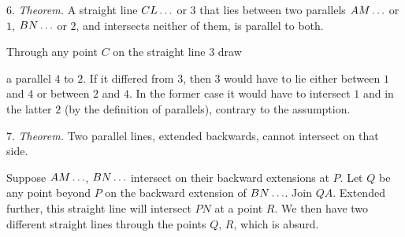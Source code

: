 6. \emph{Theorem.} A straight line $CL\mathinner{.\,.\,.}$ or $3$ that lies between two parallels $AM\mathinner{.\,.\,.}$ or $1$, $BN\mathinner{.\,.\,.}$ or $2$, and intersects neither of them, is parallel to both.

 Through any point $C$ on the straight line $3$ draw

\begin{center}

\end{center}
\noindent a parallel $4$ to $2$. If it differed from $3$, then $3$ would have to lie either between $1$ and $4$ or between $2$ and $4$. In the former case it would have to intersect $1$ and in the latter $2$ (by the definition of parallels), contrary to the assumption.

7. \emph{Theorem.} Two parallel lines, extended backwards, cannot intersect on that side.

\begin{center}

\end{center}

 Suppose $AM\mathinner{.\,.\,.}$, $BN\mathinner{.\,.\,.}$ intersect on their backward extensions at $P$. Let $Q$ be any point beyond $P$ on the backward extension of $BN\mathinner{.\,.\,.}$. Join $QA$. Extended further, this straight line will intersect $PN$ at a point $R$. We then have two different straight lines through the points $Q$, $R$, which is absurd.


